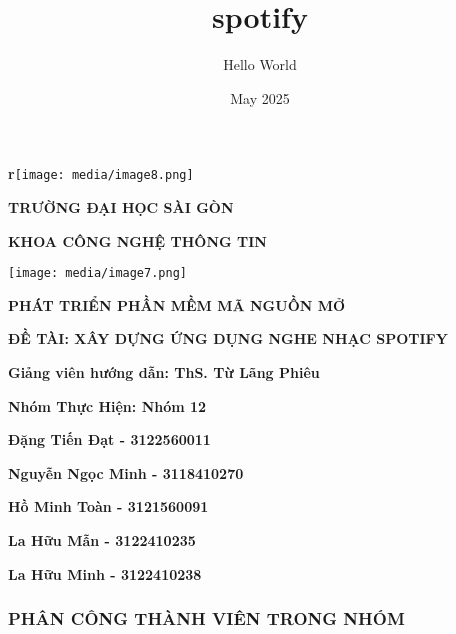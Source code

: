 \documentclass{article}
\title{spotify}
\author{Hello World}
\date{May 2025}
\begin{document}

\maketitle  %

\textbf{r}\texttt{[image: media/image8.png]}

\textbf{TRƯỜNG ĐẠI HỌC SÀI GÒN}

\textbf{KHOA CÔNG NGHỆ THÔNG TIN}

\texttt{[image: media/image7.png]}

\textbf{PHÁT TRIỂN PHẦN MỀM MÃ NGUỒN MỞ}

\textbf{ĐỀ TÀI: XÂY DỰNG ỨNG DỤNG NGHE NHẠC SPOTIFY}

\textbf{Giảng viên hướng dẫn: ThS. Từ Lãng Phiêu}

\textbf{Nhóm Thực Hiện: Nhóm 12}

\textbf{Đặng Tiến Đạt - 3122560011}

\textbf{Nguyễn Ngọc Minh - 3118410270}

\textbf{Hồ Minh Toàn - 3121560091}

\textbf{La Hữu Mẫn - 3122410235}

\textbf{La Hữu Minh - 3122410238}

\subsubsection{\texorpdfstring{\textbf{PHÂN CÔNG THÀNH VIÊN TRONG
NHÓM}}{PHÂN CÔNG THÀNH VIÊN TRONG NHÓM}}\label{phuxe2n-cuxf4ng-thuxe0nh-viuxean-trong-nhuxf3m}
\end{document}
